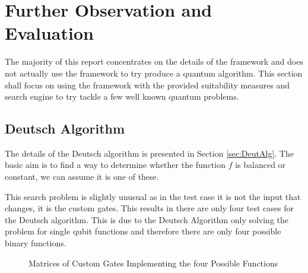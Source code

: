 \chapter{Further Observation and Evaluation}

The majority of this report concentrates on the details of the framework and does not actually use the framework to try produce a quantum algorithm.
This section shall focus on using the framework with the provided suitability measures and search engine to try tackle a few well known quantum problems.

\section{Deutsch Algorithm}
The details of the Deutsch algorithm is presented in Section \ref{sec:DeutAlg}.
The basic aim is to find a way to determine whether the function $f$ is balanced or constant, we can assume it is one of these.

This search problem is slightly unusual as in the test case it is not the input that changes, it is the custom gates.
This results in there are only four test cases for the Deutsch algorithm.
This is due to the Deutsch Algorithm only solving the problem for single qubit functions and therefore there are only four possible binary functions.



\begin{figure}
\centering
{}
\caption{Matrices of Custom Gates Implementing the four Possible Functions}
 \label{fig:deutschfunctions}
\end{figure}


